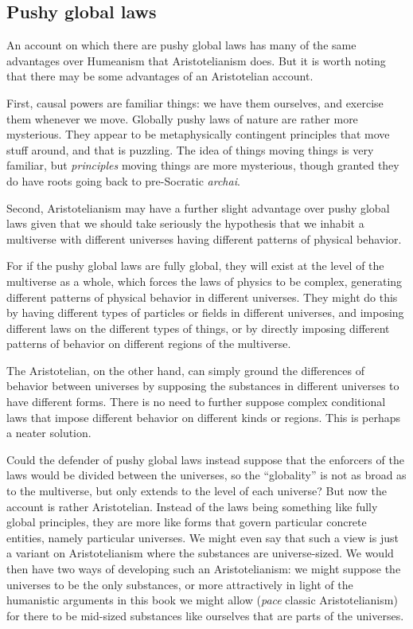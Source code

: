 \subsection{Pushy global laws}
An account on which there are pushy global laws has many of the same advantages over Humeanism that Aristotelianism
does. But it is worth noting that there may be some advantages of an Aristotelian account.

First, causal powers are familiar things: we have them ourselves, and exercise them whenever we move. Globally pushy laws of nature are rather more mysterious. 
They appear to be metaphysically contingent principles that move stuff around, and that is puzzling. The idea of
things moving things is very familiar, but \textit{principles} moving things are more mysterious, though granted
they do have roots going back to pre-Socratic \textit{archai}.

Second, Aristotelianism may have a further slight advantage over pushy global laws given that we should take seriously
the hypothesis that we inhabit a multiverse with different universes having different patterns of physical behavior. 

For if the pushy global laws are fully global, they will exist at the level of the multiverse as a whole, which forces the
laws of physics to be complex, generating different patterns of physical behavior in different universes. They might do this
by having different types of particles or fields in different universes, and imposing different laws on the 
different types of things, or by directly imposing different patterns of behavior on different regions of the multiverse.

The Aristotelian, on the other hand, can simply ground the differences of behavior between universes by supposing 
the substances in different universes to have different forms. There is no need to further suppose complex conditional 
laws that impose different behavior on different kinds or regions. This is perhaps a neater solution.

Could the defender of pushy global laws instead suppose that the enforcers of the laws would be divided between the 
universes, so the ``globality'' is not as broad as to the multiverse, but only extends to the level of each universe?
But now the account is rather Aristotelian. Instead of the laws being something like fully global principles, they are 
more like forms that govern particular concrete entities, namely particular universes. We might even say that such a 
view is just a variant on Aristotelianism where the substances are universe-sized. We would then have two ways of 
developing such an Aristotelianism: we might suppose the universes to be the only substances, or more attractively 
in light of the humanistic arguments in this book we might allow (\textit{pace} classic Aristotelianism) for there to 
be mid-sized substances like ourselves that are parts of the universes. 

